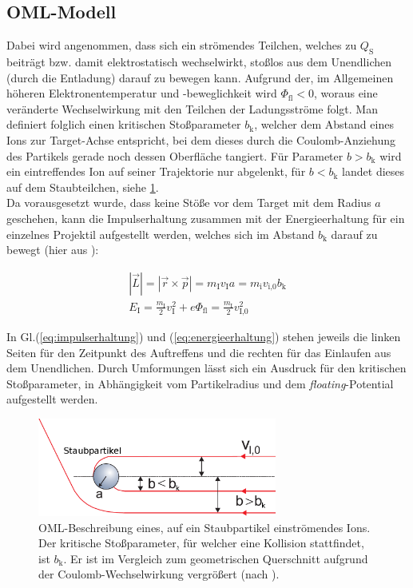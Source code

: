 \documentclass[numbers=noenddot,a4paper,notitlepage,twoside,BCOR15mm]{scrbook}
\newcommand{\ix}[1]{_\text{#1}}
\newcommand{\tilt}[1]{\textit{#1}}
\begin{document}
			\subsection{OML-Modell}\label{subsub:oml}

			Dabei wird angenommen, dass sich ein strömendes Teilchen, welches zu $Q\ix{S}$ beiträgt bzw. damit elektrostatisch wechselwirkt, stoßlos aus dem Unendlichen (durch die Entladung) darauf zu bewegen kann. Aufgrund der, im Allgemeinen höheren Elektronentemperatur und -beweglichkeit wird $\Phi\ix{fl}<0$, woraus eine veränderte Wechselwirkung mit den Teilchen der Ladungsströme folgt. Man definiert folglich einen kritischen Stoßparameter $b\ix{k}$, welcher dem Abstand eines Ions zur Target-Achse entspricht, bei dem dieses durch die Coulomb-Anziehung des Partikels gerade noch dessen Oberfläche tangiert. Für Parameter $b>b\ix{k}$ wird ein eintreffendes Ion auf seiner Trajektorie nur abgelenkt, für $b<b\ix{k}$ landet dieses auf dem Staubteilchen, siehe \ref{img:oml}.\\
			Da vorausgesetzt wurde, dass keine Stöße vor dem Target mit dem Radius $a$ geschehen, kann die Impulserhaltung zusammen mit der Energieerhaltung für ein einzelnes Projektil aufgestellt werden, welches sich im Abstand $b\ix{k}$ darauf zu bewegt (hier aus \cite{Melzer12}):

				\begin{align}
					|\vec{L}|=|\vec{r}\times\vec{p}|=m\ix{I}v\ix{I}a=m\ix{i}v\ix{i,0}b\ix{k} \label{eq:impulserhaltung} \\
					E\ix{I}=\frac{m\ix{I}}{2}v\ix{I}^2+e\Phi\ix{fl}=\frac{m\ix{I}}{2}v\ix{I,0}^2 \label{eq:energieerhaltung}
				\end{align}

			In Gl.(\ref{eq:impulserhaltung}) und (\ref{eq:energieerhaltung}) stehen jeweils die linken Seiten für den Zeitpunkt des Auftreffens und die rechten für das Einlaufen aus dem Unendlichen. Durch Umformungen lässt sich ein Ausdruck für den kritischen Stoßparameter, in Abhängigkeit vom Partikelradius und dem \tilt{floating}-Potential aufgestellt werden.

						\begin{figure}[!t]
							\centering
							\includegraphics[width=0.7\textwidth, height=0.3\textwidth]{figs/orbitalmotionlimitmelzer.png}
							\caption{OML-Beschreibung eines, auf ein Staubpartikel einströmendes Ions. Der kritische Stoßparameter, für welcher eine Kollision stattfindet, ist $b\ix{k}$. Er ist im Vergleich zum geometrischen Querschnitt aufgrund der Coulomb-Wechselwirkung vergrößert (nach \cite{Melzer12}).}
							\label{img:oml}
						\end{figure}
\end{document}
